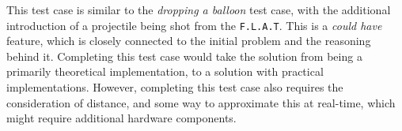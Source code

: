 This test case is similar to the \textit{dropping a balloon} test case, with the additional introduction of a projectile being shot from the \texttt{F.L.A.T}.
This is a \textit{could have} feature, which is closely connected to the initial problem and the reasoning behind it.
Completing this test case would take the solution from being a primarily theoretical implementation, to a solution with practical implementations.
However, completing this test case also requires the consideration of distance, and some way to approximate this at real-time, which might require additional hardware components.
